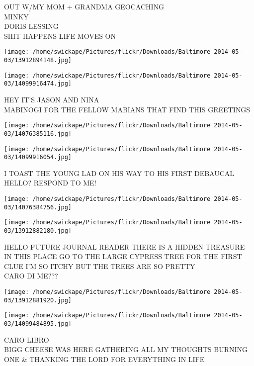 \documentclass[10pt,letterpaper]{article}
\begin{document}
OUT W/MY MOM + GRANDMA GEOCACHING\\
MINKY\\
DORIS LESSING\\
SHIT HAPPENS LIFE MOVES ON\\
\pagebreak

\texttt{[image: /home/swickape/Pictures/flickr/Downloads/Baltimore 2014-05-03/13912894148.jpg]}

\vspace{0.25in}
\texttt{[image: /home/swickape/Pictures/flickr/Downloads/Baltimore 2014-05-03/14099916474.jpg]}

HEY IT'S JASON AND NINA\\
MABINOGI FOR THE FELLOW MABIANS THAT FIND THIS GREETINGS\\
\pagebreak

\texttt{[image: /home/swickape/Pictures/flickr/Downloads/Baltimore 2014-05-03/14076385116.jpg]}

\vspace{0.25in}
\texttt{[image: /home/swickape/Pictures/flickr/Downloads/Baltimore 2014-05-03/14099916054.jpg]}

I TOAST THE YOUNG LAD ON HIS WAY TO HIS FIRST DEBAUCAL\\
HELLO?  RESPOND TO ME!\\
\pagebreak

\texttt{[image: /home/swickape/Pictures/flickr/Downloads/Baltimore 2014-05-03/14076384756.jpg]}

\vspace{0.25in}
\texttt{[image: /home/swickape/Pictures/flickr/Downloads/Baltimore 2014-05-03/13912882180.jpg]}

HELLO FUTURE JOURNAL READER THERE IS A HIDDEN TREASURE IN THIS PLACE GO TO THE LARGE CYPRESS TREE FOR THE FIRST CLUE I'M SO ITCHY BUT THE TREES ARE SO PRETTY\\
CARO DI ME???\\
\pagebreak

\texttt{[image: /home/swickape/Pictures/flickr/Downloads/Baltimore 2014-05-03/13912881920.jpg]}

\vspace{0.25in}
\texttt{[image: /home/swickape/Pictures/flickr/Downloads/Baltimore 2014-05-03/14099484895.jpg]}

CARO LIBRO\\
BIGG CHEESE WAS HERE GATHERING ALL MY THOUGHTS BURNING ONE \& THANKING THE LORD FOR EVERYTHING IN LIFE\\
\pagebreak
\end{document}
